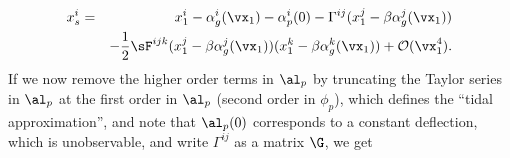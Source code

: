 \begin{eqnarray}
x^i_s &=& x^i_1 - \alpha^i_g(\vx_1) - \alpha_p^i(0) - \Gamma^{ij} (x^j_1 - \beta \alpha^j_g(\vx_1)) \nonumber \\
&&- \frac{1}{2} \sF^{ijk} (x^j_1 - \beta \alpha^j_g(\vx_1)) (x^k_1 - \beta \alpha^k_g(\vx_1)) + \mathcal{O}(\vx_1^4) .
\end{eqnarray}
\normalsize
If we now remove the higher order terms in $\al_p$ by truncating the Taylor series in $\al_p$ at the first order in $\al_p$ (second order in $\phi_p$), which defines the ``tidal approximation'', and note that $\al_p(0)$ corresponds to a constant deflection, which is unobservable, and write $\Gamma^{ij}$ as a matrix $\G$, we get